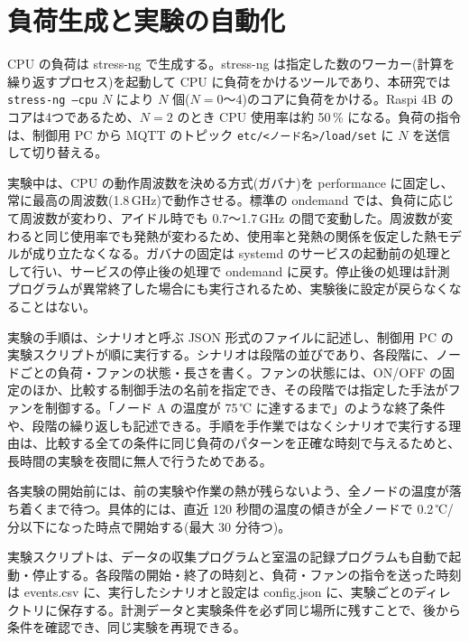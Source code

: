 \section{負荷生成と実験の自動化}\label{sec:impl-auto}
CPU の負荷は stress-ng で生成する。stress-ng は指定した数のワーカー(計算を繰り返すプロセス)を起動して CPU に負荷をかけるツールであり、本研究では \texttt{stress-ng --cpu} $N$ により $N$ 個($N=0$〜4)のコアに負荷をかける。Raspi 4B のコアは4つであるため、$N=2$ のとき CPU 使用率は約 50\,\% になる。負荷の指令は、制御用 PC から MQTT のトピック \texttt{etc/<ノード名>/load/set} に $N$ を送信して切り替える。

実験中は、CPU の動作周波数を決める方式(ガバナ)を performance に固定し、常に最高の周波数(1.8\,GHz)で動作させる。標準の ondemand では、負荷に応じて周波数が変わり、アイドル時でも 0.7〜1.7\,GHz の間で変動した。周波数が変わると同じ使用率でも発熱が変わるため、使用率と発熱の関係を仮定した熱モデルが成り立たなくなる。ガバナの固定は systemd のサービスの起動前の処理として行い、サービスの停止後の処理で ondemand に戻す。停止後の処理は計測プログラムが異常終了した場合にも実行されるため、実験後に設定が戻らなくなることはない。

実験の手順は、シナリオと呼ぶ JSON 形式のファイルに記述し、制御用 PC の実験スクリプトが順に実行する。シナリオは段階の並びであり、各段階に、ノードごとの負荷・ファンの状態・長さを書く。ファンの状態には、ON/OFF の固定のほか、比較する制御手法の名前を指定でき、その段階では指定した手法がファンを制御する。「ノード A の温度が 75\,℃ に達するまで」のような終了条件や、段階の繰り返しも記述できる。手順を手作業ではなくシナリオで実行する理由は、比較する全ての条件に同じ負荷のパターンを正確な時刻で与えるためと、長時間の実験を夜間に無人で行うためである。

各実験の開始前には、前の実験や作業の熱が残らないよう、全ノードの温度が落ち着くまで待つ。具体的には、直近 120 秒間の温度の傾きが全ノードで 0.2\,℃/分以下になった時点で開始する(最大 30 分待つ)。

実験スクリプトは、データの収集プログラムと室温の記録プログラムも自動で起動・停止する。各段階の開始・終了の時刻と、負荷・ファンの指令を送った時刻は events.csv に、実行したシナリオと設定は config.json に、実験ごとのディレクトリに保存する。計測データと実験条件を必ず同じ場所に残すことで、後から条件を確認でき、同じ実験を再現できる。

